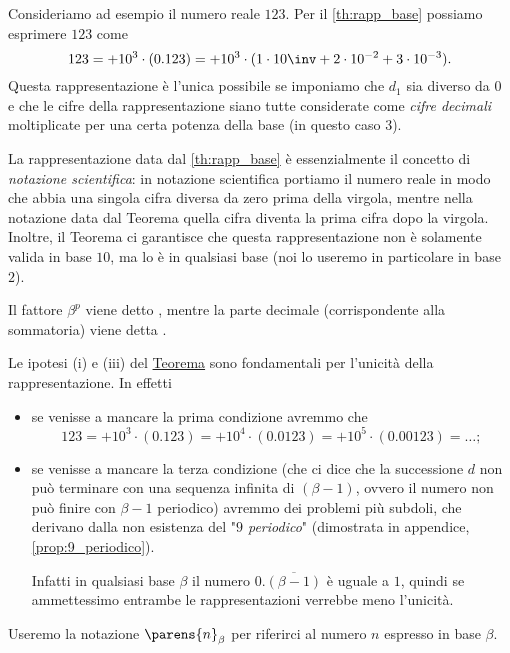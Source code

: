 \begin{example}
    Consideriamo ad esempio il numero reale $123$. Per il \autoref{th:rapp_base} possiamo esprimere $123$ come \[
        123 = +10^3 \cdot (0.123) = + 10^3 \cdot (1 \cdot 10\inv + 2 \cdot 10^{-2} + 3 \cdot 10^{-3}).
    \] Questa rappresentazione è l'unica possibile se imponiamo che $d_1$ sia diverso da $0$ e che le cifre della rappresentazione siano tutte considerate come \emph{cifre decimali} moltiplicate per una certa potenza della base (in questo caso $3$).
\end{example}

La rappresentazione data dal \autoref{th:rapp_base} è essenzialmente il concetto di \emph{notazione scientifica}: in notazione scientifica portiamo il numero reale in modo che abbia una singola cifra diversa da zero prima della virgola, mentre nella notazione data dal Teorema quella cifra diventa la prima cifra dopo la virgola. 
Inoltre, il Teorema ci garantisce che questa rappresentazione non è solamente valida in base $10$, ma lo è in qualsiasi base (noi lo useremo in particolare in base $2$).

Il fattore $\beta^p$ viene detto , mentre la parte decimale (corrispondente alla sommatoria) viene detta . 

\begin{remark} 
    Le ipotesi (i) e (iii) del \hyperref[th:rapp_base]{Teorema} sono fondamentali per l'unicità della rappresentazione. In effetti
    \begin{itemize}
        \item se venisse a mancare la prima condizione avremmo che \[
            123 = +10^3 \cdot (0.123) = +10^4 \cdot (0.0123) = +10^5 \cdot (0.00123) = \dots;
        \]
        \item se venisse a mancare la terza condizione 
        (che ci dice che la successione $d$ non può terminare con una sequenza infinita di $(\beta - 1)$, ovvero il numero non può finire con $\beta-1$ periodico) 
        avremmo dei problemi più subdoli, che derivano dalla non esistenza del "\emph{$9$ periodico}" (dimostrata in appendice, \autoref{prop:9_periodico}). 
        
        Infatti in qualsiasi base $\beta$ il numero $0.\overline{(\beta-1)}$ è uguale a $1$, quindi se ammettessimo entrambe le rappresentazioni verrebbe meno l'unicità.
    \end{itemize}
\end{remark}

\begin{notation}
    Useremo la notazione $\parens{n}_\beta$ per riferirci al numero $n$ espresso in base $\beta$. 
\end{notation}


